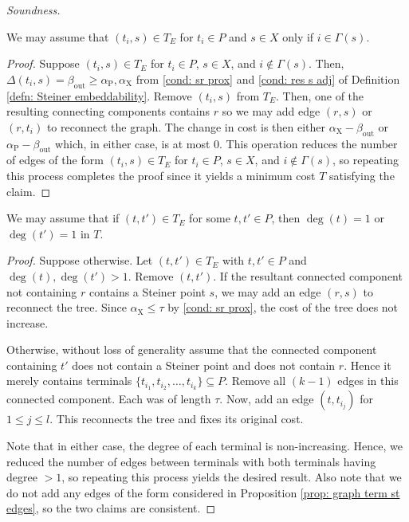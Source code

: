 \documentclass{theoretics}
\newcommand{\1}{\textbf{1}}
\newcommand{\td}{\tau}
\newcommand{\srd}{\alpha_{\text{X}}}
\newcommand{\trd}{\alpha_{\text{P}}}
\begin{document}
\begin{paragraph}{\textit{Soundness.}}
 \begin{proposition} \label{prop: graph term st edges}
 We may assume that $(t_i, s) \in T_E$ for $t_i \in P$ and $s \in X$ only if $i \in \Gamma(s)$.
 \end{proposition}
 \begin{proof}
  Suppose $(t_i,s) \in T_E$ for $t_i \in P$, $s \in X$, and $i \not\in \Gamma(s)$. Then, $\Delta(t_i,s) = \beta_{\text{out}} \geq \trd, \srd$ from \ref{cond: sr prox} and \ref{cond: res s adj} of Definition \ref{defn: Steiner embeddability}. Remove $(t_i,s)$ from $T_E$. Then, one of the resulting connecting components contains $r$ so we may add edge $(r,s)$ or $(r, t_i)$ to reconnect the graph. The change in cost is then either $\srd - \beta_{\text{out}}$ or $\trd - \beta_{\text{out}}$ which, in either case, is at most $0$. This operation reduces the number of edges of the form $(t_i,s) \in T_E$ for $t_i \in P$, $s \in X$, and $i \not\in \Gamma(s)$, so repeating this process completes the proof since it yields a minimum cost $T$ satisfying the claim.
 \end{proof}
 
 
  \begin{lemma} \label{lem: graph deg condition term}
 We may assume that if $(t, t') \in T_E$  for some $t, t' \in P$, then $\deg(t) = 1$ or $\deg(t') = 1$ in $T$.
 \end{lemma}
 \begin{proof}
 Suppose otherwise. Let $(t,t') \in T_E$ with $t,t' \in P$ and $\deg(t), \deg(t') > 1$. Remove $(t,t')$. If the resultant connected component not containing $r$ contains a Steiner point $s$, we may add an edge $(r,s)$ to reconnect the tree. Since $\srd \leq \td$ by \ref{cond: sr prox}, the cost of the tree does not increase.
 
 Otherwise, without loss of generality assume that the connected component containing $t'$ does not contain a Steiner point and does not contain $r$. Hence it merely contains terminals $\{t_{i_1}, t_{i_2}, \ldots, t_{i_k}\} \subseteq P$. Remove all $(k-1)$ edges in this connected component. Each was of length $\td$. Now, add an edge $(t, t_{i_j})$ for $1 \leq j \leq l$. This reconnects the tree and fixes its original cost. 
 
 Note that in either case, the degree of each terminal is non-increasing. Hence, we reduced the number of edges between terminals with both terminals having degree $> 1$, so repeating this process yields the desired result. Also note that we do not add any edges of the form considered in Proposition \ref{prop: graph term st edges}, so the two claims are consistent.
 \end{proof}
 

\end{paragraph}
\end{document}

